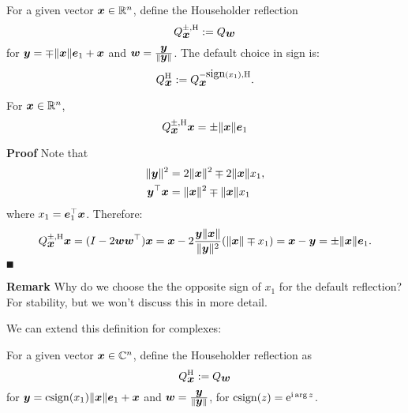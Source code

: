 \begin{definition} For a given vector $\bm{{\mbox{\boldmath$x$\unboldmath}}} \in {\mathbb R}^n$, define the Householder reflection
\[
Q_{\bm{{\mbox{\boldmath$x$\unboldmath}}}}^{\pm,\rm H} := Q_{\bm{{\mbox{\boldmath$w$\unboldmath}}}}
\]
for $\bm{{\mbox{\boldmath$y$\unboldmath}}} = \mp \|\bm{{\mbox{\boldmath$x$\unboldmath}}}\| \bm{{\mbox{\boldmath$e$\unboldmath}}}_1 + \bm{{\mbox{\boldmath$x$\unboldmath}}}$ and $\bm{{\mbox{\boldmath$w$\unboldmath}}} = {\bm{{\mbox{\boldmath$y$\unboldmath}}} \over \|\bm{{\mbox{\boldmath$y$\unboldmath}}}\|}$. The default choice in sign is:
\[
Q_{\bm{{\mbox{\boldmath$x$\unboldmath}}}}^{\rm H} := Q_{\bm{{\mbox{\boldmath$x$\unboldmath}}}}^{-\hbox{sign}(x_1),\rm H}.
\]
\end{definition}

\begin{lemma} For $\bm{{\mbox{\boldmath$x$\unboldmath}}} \in {\mathbb R}^n$,
\[
Q_{\bm{{\mbox{\boldmath$x$\unboldmath}}}}^{\pm,\rm H} \bm{{\mbox{\boldmath$x$\unboldmath}}} = \pm\|\bm{{\mbox{\boldmath$x$\unboldmath}}}\| \bm{{\mbox{\boldmath$e$\unboldmath}}}_1
\]
\end{lemma}
\textbf{Proof} Note that
\begin{align*}
\| \bm{{\mbox{\boldmath$y$\unboldmath}}} \|^2 &= 2\|\bm{{\mbox{\boldmath$x$\unboldmath}}}\|^2 \mp 2 \|\bm{{\mbox{\boldmath$x$\unboldmath}}}\| x_1, \\
\bm{{\mbox{\boldmath$y$\unboldmath}}}^\top \bm{{\mbox{\boldmath$x$\unboldmath}}} &= \|\bm{{\mbox{\boldmath$x$\unboldmath}}}\|^2 \mp  \|\bm{{\mbox{\boldmath$x$\unboldmath}}}\| x_1
\end{align*}
where $x_1 = \bm{{\mbox{\boldmath$e$\unboldmath}}}_1^\top \bm{{\mbox{\boldmath$x$\unboldmath}}}$. Therefore:
\[
Q_{\bm{{\mbox{\boldmath$x$\unboldmath}}}}^{\pm,\rm H} \bm{{\mbox{\boldmath$x$\unboldmath}}}  =  (I - 2 \bm{{\mbox{\boldmath$w$\unboldmath}}} \bm{{\mbox{\boldmath$w$\unboldmath}}}^\top) \bm{{\mbox{\boldmath$x$\unboldmath}}} = \bm{{\mbox{\boldmath$x$\unboldmath}}} - 2 {\bm{{\mbox{\boldmath$y$\unboldmath}}}  \|\bm{{\mbox{\boldmath$x$\unboldmath}}}\|  \over \|\bm{{\mbox{\boldmath$y$\unboldmath}}}\|^2} (\|\bm{{\mbox{\boldmath$x$\unboldmath}}}\|\mp x_1) = \bm{{\mbox{\boldmath$x$\unboldmath}}} - \bm{{\mbox{\boldmath$y$\unboldmath}}} =  \pm\|\bm{{\mbox{\boldmath$x$\unboldmath}}}\| \bm{{\mbox{\boldmath$e$\unboldmath}}}_1.
\]
\ensuremath{\QED}

\textbf{Remark} Why do we choose the the opposite sign of $x_1$ for the default reflection? For stability, but we won't discuss this in more detail.

We can extend this definition for complexes:

\begin{definition} For a given vector $\bm{{\mbox{\boldmath$x$\unboldmath}}} \in {\mathbb C}^n$, define the Householder reflection as
\[
Q_{\bm{{\mbox{\boldmath$x$\unboldmath}}}}^{\rm H} := Q_{\bm{{\mbox{\boldmath$w$\unboldmath}}}}
\]
for $\bm{{\mbox{\boldmath$y$\unboldmath}}} = {\rm csign}(x_1) \|\bm{{\mbox{\boldmath$x$\unboldmath}}}\| \bm{{\mbox{\boldmath$e$\unboldmath}}}_1 + \bm{{\mbox{\boldmath$x$\unboldmath}}}$ and $\bm{{\mbox{\boldmath$w$\unboldmath}}} = {\bm{{\mbox{\boldmath$y$\unboldmath}}} \over \|\bm{{\mbox{\boldmath$y$\unboldmath}}}\|}$, for ${\rm csign}(z) = {\rm e}^{{\rm i} \arg z}$.  \end{definition}

